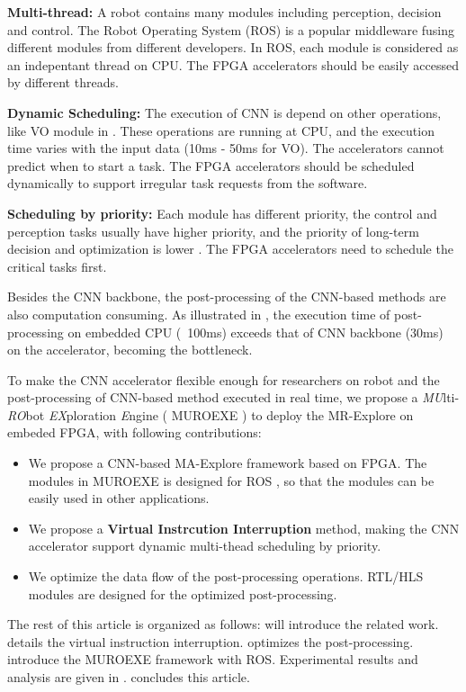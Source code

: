 \textbf{Multi-thread:} A robot contains many modules including perception, decision and control. The Robot Operating System (ROS) \cite{quigley2009ros} is a popular middleware fusing different modules from different developers. In ROS, each module is considered as an indepentant thread on CPU. The FPGA accelerators should be easily accessed by different threads.

\textbf{Dynamic Scheduling:} The execution of CNN is depend on other operations, like VO module in . These operations are running at CPU, and the execution time varies with the input data (10ms - 50ms for VO). The accelerators cannot predict when to start a task. The FPGA accelerators should be scheduled dynamically to support irregular task requests from the software.

\textbf{Scheduling by priority:} Each module has different priority, the control and perception tasks usually have higher priority, and the priority of long-term decision and optimization is lower \cite{RamsauerKLM17}. The FPGA accelerators need to schedule the critical tasks first.

Besides the CNN backbone, the post-processing of the CNN-based methods are also computation consuming. As illustrated in , the execution time of post-processing on embedded CPU (~100ms) exceeds that of CNN backbone (30ms) on the accelerator, becoming the bottleneck.


To make the CNN accelerator flexible enough for researchers on robot and the post-processing of CNN-based method executed in real time, we propose a \textit{MU}lti-\textit{RO}bot \textit{EX}ploration \textit{E}ngine ( MUROEXE ) to deploy the MR-Explore on embeded FPGA, with following contributions:

\begin{itemize}
    \item We propose a CNN-based MA-Explore framework based on FPGA. The modules in MUROEXE is designed for ROS \cite{quigley2009ros}, so that the modules can be easily used in other applications.
    \item We propose a \textbf{Virtual Instrcution Interruption} method, making the CNN accelerator support dynamic multi-thead scheduling by priority.
    \item We optimize the data flow of the post-processing operations. RTL/HLS modules are designed for the optimized post-processing.
\end{itemize}

The rest of this article is organized as follows:  will introduce the related work.  details the virtual instruction interruption.  optimizes the post-processing.  introduce the MUROEXE framework with ROS. Experimental results and analysis are given in .  concludes this article.
